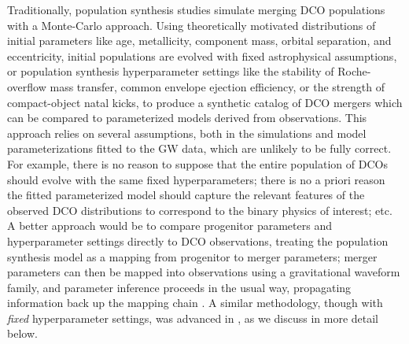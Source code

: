 \documentclass[twocolumn]{aastex631}
\begin{document}
Traditionally, population synthesis studies simulate merging DCO populations
with a Monte-Carlo approach.  Using theoretically motivated distributions of
initial parameters like age, metallicity, component mass, orbital separation,
and eccentricity, initial populations are evolved with fixed astrophysical
assumptions, or population synthesis hyperparameter settings like the stability 
of Roche-overflow mass transfer, common envelope ejection efficiency, or the 
strength of compact-object natal kicks, to produce a
synthetic catalog of DCO mergers which can be compared to parameterized models
derived from observations. This approach relies on several assumptions, both in
the simulations and model parameterizations fitted to the GW data, which are
unlikely to be fully correct.  For example, there is no reason to suppose that
the entire population of DCOs should evolve with the same fixed hyperparameters;
there is no a priori reason the fitted parameterized model should capture the
relevant features of the observed DCO distributions to correspond to the binary
physics of interest; etc. A better approach would be to compare progenitor
parameters and hyperparameter settings directly to DCO observations, treating
the population synthesis model as a mapping from progenitor to merger
parameters; merger parameters can then be mapped into observations using a
gravitational waveform family, and parameter inference proceeds in the usual
way, propagating information back up the mapping chain
\citep[e.g.][]{Veitch2015}.  A similar methodology, though with \emph{fixed}
hyperparameter settings, was advanced in \citet{Andrews2018,Andrews2021}, as we
discuss in more detail below.
\end{document}
